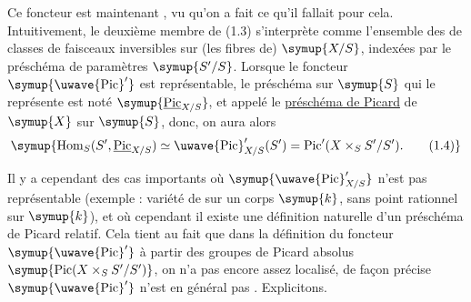 Ce foncteur est maintenant , vu qu'on a fait ce qu'il
fallait pour cela. Intuitivement, le deuxième membre de (1.3) s'interprète
comme l'ensemble des  de classes de faisceaux
inversibles sur (les fibres de) $\symup{X/S}$, indexées par le préschéma de paramètres
$\symup{S'/S}$. Lorsque le foncteur $\symup{\mathop{\text{\uwave{Pic}}}\nolimits'}$ est représentable, le
préschéma sur $\symup{S}$ qui le représente est noté $\symup{\underline{\operatorname{Pic}}_{X/S}}$, et
appelé le \uline{préschéma de Picard} de $\symup{X}$ sur $\symup{S}$, donc, on aura alors
\begin{equation}
\symup{\operatorname{Hom}_S(S',\underline{\operatorname{Pic}}_{X/S})
\simeq\mathop{\text{\uwave{Pic}}}\nolimits'_{X/S}(S')
=\operatorname{Pic}'(X\times_S S'/S').
\tag{1.4}}
\end{equation}

Il y a cependant des cas importants où $\symup{\mathop{\text{\uwave{Pic}}}\nolimits'_{X/S}}$ n'est pas
représentable (exemple : variété de  sur un corps $\symup{k}$, sans
point rationnel sur $\symup{k}$), et où cependant il existe une définition naturelle
d'un préschéma de Picard relatif. Cela tient au fait que dans la définition du
foncteur $\symup{\mathop{\text{\uwave{Pic}}}\nolimits'}$ à partir des groupes de Picard absolus
$\symup{\operatorname{Pic}(X\times_S S'/S')}$, on n'a pas encore assez localisé, de
façon précise $\symup{\mathop{\text{\uwave{Pic}}}\nolimits'}$ n'est en général pas . Explicitons.


